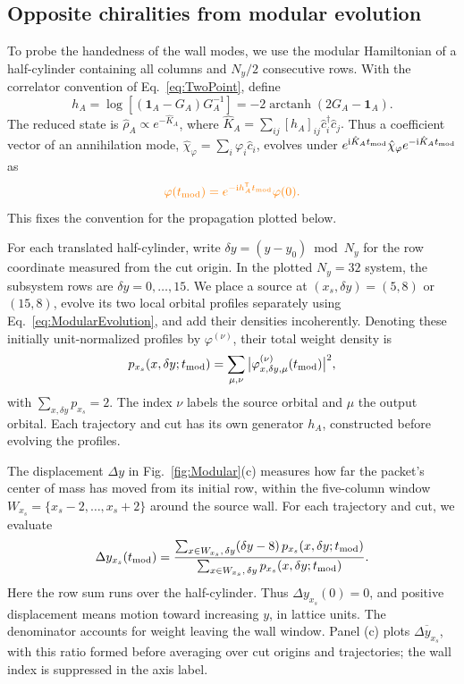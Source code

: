 \documentclass[aps,prb,10pt,twocolumn,superscriptaddress,longbibliography,floatfix]{revtex4-2}
\DeclareMathOperator\arctanh{arctanh}
\newcommand{\ii}{\mathrm{i}}
\newcommand{\Id}{\mathbf{1}}
\newcommand{\claudeadd}[1]{{\color{orange}#1}}
\begin{document}
{\color{blue}
\subsection{Opposite chiralities from modular evolution}
\label{sec:ModularEvolution}

To probe the handedness of the wall modes, we use the modular Hamiltonian of a half-cylinder containing all columns and $N_y/2$ consecutive rows. With the correlator convention of Eq.~\eqref{eq:TwoPoint}, define
\begin{equation}
 h_A=\log[(\Id_A-G_A)G_A^{-1}]=-2\arctanh(2G_A-\Id_A).
 \label{eq:ModularHamiltonian}
\end{equation}
The reduced state is $\hat\rho_A\propto e^{-\hat K_A}$, where \claudeadd{$\hat K_A=\sum_{ij}[h_A]_{ij}\hat c_i^\dagger\hat c_j$.} Thus a coefficient vector of an annihilation mode, $\hat\chi_\varphi=\sum_i\varphi_i\hat c_i$, evolves under $e^{\ii\hat K_A t_{\rm mod}}\hat\chi_\varphi e^{-\ii\hat K_A t_{\rm mod}}$ as
\begin{equation}
 \claudeadd{\varphi(t_{\rm mod})=e^{-\ii h_A^{\mathsf T} t_{\rm mod}}\varphi(0).}
 \label{eq:ModularEvolution}
\end{equation}
This fixes the convention for the propagation plotted below.

For each translated half-cylinder, write $\delta y=(y-y_0)\bmod N_y$ for the row coordinate measured from the cut origin. In the plotted $N_y=32$ system, the subsystem rows are $\delta y=0,\ldots,15$. We place a source at $(x_s,\delta y)=(5,8)$ or $(15,8)$, evolve its two local orbital profiles separately using Eq.~\eqref{eq:ModularEvolution}, and add their densities incoherently. Denoting these initially unit-normalized profiles by $\varphi^{(\nu)}$, their total weight density is
\begin{equation}
 p_{x_s}(x,\delta y;t_{\rm mod})=
 \sum_{\mu,\nu}\big|\varphi^{(\nu)}_{x,\delta y,\mu}(t_{\rm mod})\big|^2,
 \label{eq:ModularPacketDensity}
\end{equation}
with $\sum_{x,\delta y}p_{x_s}=2$. The index $\nu$ labels the source orbital and $\mu$ the output orbital. Each trajectory and cut has its own generator $h_A$, constructed before evolving the profiles.

The displacement $\Delta y$ in Fig.~\ref{fig:Modular}(c) measures how far the packet's center of mass has moved from its initial row, within the five-column window $W_{x_s}=\{x_s-2,\ldots,x_s+2\}$ around the source wall. For each trajectory and cut, we evaluate
\begin{equation}
 \Delta y_{x_s}(t_{\rm mod})=
 \frac{\sum_{x\in W_{x_s},\,\delta y}(\delta y-8)\,p_{x_s}(x,\delta y;t_{\rm mod})}
 {\sum_{x\in W_{x_s},\,\delta y}p_{x_s}(x,\delta y;t_{\rm mod})}.
 \label{eq:ModularDisplacement}
\end{equation}
Here the row sum runs over the half-cylinder. Thus $\Delta y_{x_s}(0)=0$, and positive displacement means motion toward increasing $y$, in lattice units. The denominator accounts for weight leaving the wall window. Panel (c) plots $\overline{\Delta y_{x_s}}$, with this ratio formed before averaging over cut origins and trajectories; the wall index is suppressed in the axis label.

}
\end{document}
